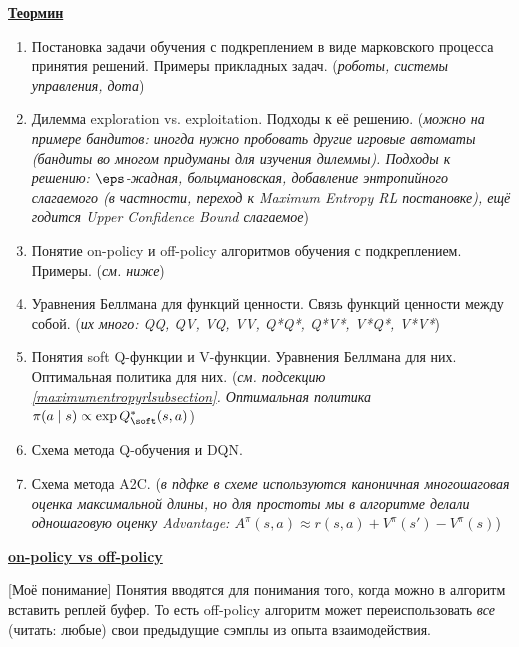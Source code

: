 \begin{center}
\textcolor{ChadBlue}{\underline{\textbf{Теормин}}}   
\end{center}

\begin{enumerate}
\item Постановка задачи обучения с подкреплением в виде марковского процесса принятия решений.
Примеры прикладных задач. (\textit{роботы, системы управления, дота})
\item Дилемма exploration vs. exploitation. Подходы к её решению. (\textit{можно на примере бандитов: иногда нужно пробовать другие игровые автоматы (бандиты во многом придуманы для изучения дилеммы). Подходы к решению: $\eps$-жадная, больцмановская, добавление энтропийного слагаемого (в частности, переход к Maximum Entropy RL постановке), ещё годится Upper Confidence Bound слагаемое})
\item Понятие on-policy и off-policy алгоритмов обучения с подкреплением. Примеры. (\textit{см. ниже})
\item Уравнения Беллмана для функций ценности. Связь функций ценности между собой. (\textit{их много: QQ, QV, VQ, VV, Q*Q*, Q*V*, V*Q*, V*V*})
\item Понятия soft Q-функции и V-функции. Уравнения Беллмана для них. Оптимальная политика
для них. (\textit{см. подсекцию \ref{maximumentropyrlsubsection}. Оптимальная политика $\pi(a \mid s) \propto \exp Q^*_{\soft}(s, a)$})
\item Схема метода Q-обучения и DQN.
\item Схема метода A2C. (\textit{в пдфке в схеме используются каноничная многошаговая оценка максимальной длины, но для простоты мы в алгоритме делали одношаговую оценку Advantage: $A^\pi(s, a) \approx r(s, a) + V^{\pi}(s') - V^{\pi}(s)$})
\end{enumerate}

\begin{center}
\textcolor{ChadBlue}{\underline{\textbf{on-policy vs off-policy}}}   
\end{center}

[Моё понимание] Понятия вводятся для понимания того, когда можно в алгоритм вставить реплей буфер. То есть off-policy алгоритм может переиспользовать \textit{все} (читать: любые) свои предыдущие сэмплы из опыта взаимодействия.

